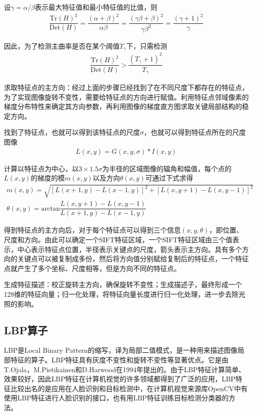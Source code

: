 \documentclass[supercite]{HustGraduPaper}
\begin{document}
\begin{sloppypar}
\begin{appendices}
    设$\gamma=\alpha/\beta$表示最大特征值和最小特征值的比值，则\begin{gather}
     \dfrac{\text{Tr}(H)^2}{\text{Det}(H)}=\dfrac{(\alpha+\beta)^2}{\alpha\beta}=\dfrac{(\gamma\beta+\beta)^2}{\gamma\beta^2}=\dfrac{(\gamma+1)^2}{\gamma}
    \end{gather}

    因此，为了检测主曲率是否在某个阈值$T_{\gamma}$下，只需检测\begin{gather}
      \dfrac{\text{Tr}(H)^2}{\text{Det}(H)}>\dfrac{(T_{\gamma}+1)^2}{T_{\gamma}}
    \end{gather}

    {\heiti  求取特征点的主方向：}经过上面的步骤已经找到了在不同尺度下都存在的特征点，为了实现图像旋转不变性，需要给特征点的方向进行赋值。利用特征点邻域像素的梯度分布特性来确定其方向参数，再利用图像的梯度直方图求取关键局部结构的稳定方向。

    找到了特征点，也就可以得到该特征点的尺度$\sigma$，也就可以得到特征点所在的尺度图像\begin{gather}
     L(x,y)=G(x,y,\sigma)*I(x,y)
    \end{gather}

    计算以特征点为中心，以$3\times 1.5\sigma$为半径的区域图像的辐角和幅值，每个点的$L(x,y)$的梯度的模$m(x,y)$以及方向$\theta(x,y)$可通过下式求得\begin{gather}
      m(x,y)=\sqrt{[L(x+1,y)-L(x-1,y)]^2+[L(x,y+1)-L(x,y-1)]^2}\\
      \theta(x,y)=\text{arctan}\dfrac{L(x,y+1)-L(x,y-1)}{L(x+1,y)-L(x-1,y)}
    \end{gather}

    得到特征点的主方向后，对于每个特征点可以得到三个信息$(x,y,\theta)$，即位置、尺度和方向。由此可以确定一个SIFT特征区域，一个SIFT特征区域由三个值表示，中心表示特征点位置，半径表示关键点的尺度，箭头表示主方向。具有多个方向的关键点可以被复制成多份，然后将方向值分别赋给复制后的特征点，一个特征点就产生了多个坐标、尺度相等，但是方向不同的特征点。

    {\heiti  生成特征描述：}校正旋转主方向，确保旋转不变性；生成描述子，最终形成一个128维的特征向量；归一化处理，将特征向量长度进行归一化处理，进一步去除光照的影响。
    \subsection{LBP算子}
    LBP是Local Binary Pattern的缩写，译为局部二值模式，是一种用来描述图像局部特征的算子。LBP特征具有灰度不变性和旋转不变性等显著优点。它是由T.Ojala，M.Pietikainen和D.Harwood在1994年提出的。由于LBP特征计算简单、效果较好，因此LBP特征在计算机视觉的许多领域都得到了广泛的应用，LBP特征比较出名的是应用在人脸识别和目标检测中，在计算机视觉来源库OpenCV中有使用LBP特征进行人脸识别的接口，也有用LBP特征训练目标检测分类器的方法。


\end{appendices}
\end{sloppypar}
\end{document}

